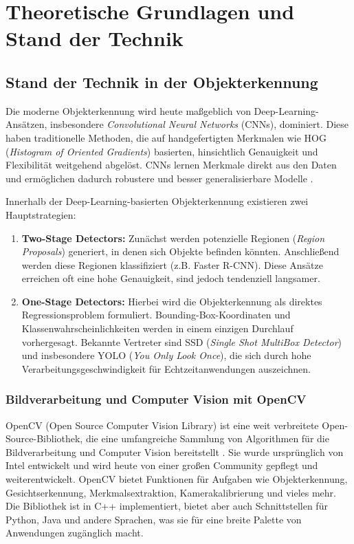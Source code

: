\section{Theoretische Grundlagen und Stand der Technik}

\subsection{Stand der Technik in der Objekterkennung}

Die moderne Objekterkennung wird heute maßgeblich von Deep-Learning-Ansätzen, insbesondere \textit{Convolutional Neural Networks} (CNNs), dominiert. Diese haben traditionelle Methoden, die auf handgefertigten Merkmalen wie HOG (\textit{Histogram of Oriented Gradients}) basierten, hinsichtlich Genauigkeit und Flexibilität weitgehend abgelöst. CNNs lernen Merkmale direkt aus den Daten und ermöglichen dadurch robustere und besser generalisierbare Modelle \cite{ultralytics_cv_2025}.

Innerhalb der Deep-Learning-basierten Objekterkennung existieren zwei Hauptstrategien:

\begin{enumerate}
    \item \textbf{Two-Stage Detectors:} Zunächst werden potenzielle Regionen (\textit{Region Proposals}) generiert, in denen sich Objekte befinden könnten. Anschließend werden diese Regionen klassifiziert (z.B. Faster R-CNN). Diese Ansätze erreichen oft eine hohe Genauigkeit, sind jedoch tendenziell langsamer.
    \item \textbf{One-Stage Detectors:} Hierbei wird die Objekterkennung als direktes Regressionsproblem formuliert. Bounding-Box-Koordinaten und Klassenwahrscheinlichkeiten werden in einem einzigen Durchlauf vorhergesagt. Bekannte Vertreter sind SSD (\textit{Single Shot MultiBox Detector}) und insbesondere YOLO (\textit{You Only Look Once}), die sich durch hohe Verarbeitungsgeschwindigkeit für Echtzeitanwendungen auszeichnen.
\end{enumerate}

\subsubsection{Bildverarbeitung und Computer Vision mit OpenCV}

OpenCV (Open Source Computer Vision Library) ist eine weit verbreitete Open-Source-Bibliothek, die eine umfangreiche Sammlung von Algorithmen für die Bildverarbeitung und Computer Vision bereitstellt \cite{opencv_website}. Sie wurde ursprünglich von Intel entwickelt und wird heute von einer großen Community gepflegt und weiterentwickelt. OpenCV bietet Funktionen für Aufgaben wie Objekterkennung, Gesichtserkennung, Merkmalsextraktion, Kamerakalibrierung und vieles mehr. Die Bibliothek ist in C++ implementiert, bietet aber auch Schnittstellen für Python, Java und andere Sprachen, was sie für eine breite Palette von Anwendungen zugänglich macht.

